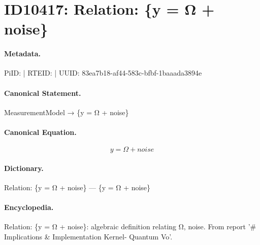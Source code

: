\section*{ID10417: Relation: \{y = Ω + noise\}}
\paragraph{Metadata.}
PiID:  | RTEID:  | UUID: 83ea7b18-af44-583c-bfbf-1baaada3894e

\paragraph{Canonical Statement.}
MeasurementModel → \{y = Ω + noise\}

\paragraph{Canonical Equation.}
\[
{y = Ω + noise}
\]

\paragraph{Dictionary.}
Relation: \{y = Ω + noise\} — \{y = Ω + noise\}

\paragraph{Encyclopedia.}
Relation: \{y = Ω + noise\}: algebraic definition relating Ω, noise. From report '\# Implications \& Implementation Kernel- Quantum Vo'.
